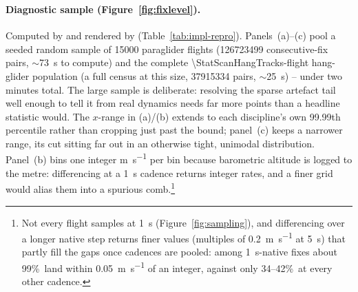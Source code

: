 \subsubsection{}

\paragraph{Diagnostic sample (Figure~\ref{fig:fixlevel}).}\label{impl:fixsample} Computed by
 and rendered by 
(Table~\ref{tab:impl-repro}). Panels~(a)--(c) pool a seeded random sample of \num{15000}
paraglider flights (\num{126723499} consecutive-fix pairs, $\sim$\SI{73}{\second} to compute)
and the complete \num{\StatScanHangTracks}-flight hang-glider population (a full census
at this size,
\num{37915334} pairs, $\sim$\SI{25}{\second}) -- under two minutes total. The large sample is
deliberate: resolving the sparse artefact tail well enough to tell it from real dynamics
needs far more points than a headline statistic would. The $x$-range in (a)/(b) extends to
each discipline's own 99.99th percentile rather than cropping just past the bound; panel~(c)
keeps a narrower range, its cut sitting far out in an otherwise tight, unimodal distribution.
Panel~(b) bins one integer \si{\metre\per\second} per bin because barometric altitude is
logged to the metre: differencing at a \SI{1}{\second} cadence returns integer rates, and a
finer grid would alias them into a spurious comb.\footnote{Not every flight samples at
\SI{1}{\second} (Figure~\ref{fig:sampling}), and differencing over a longer native step
returns finer values (multiples of \SI{0.2}{\metre\per\second} at \SI{5}{\second}) that
partly fill the gaps once cadences are pooled: among \SI{1}{\second}-native fixes about
99\%\ land within \SI{0.05}{\metre\per\second} of an integer, against only 34--42\%\ at every
other cadence.}

